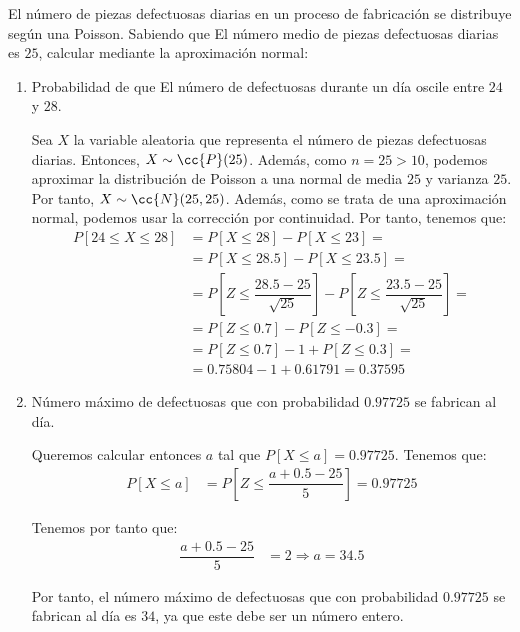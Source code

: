 \begin{ejercicio}
    El número de piezas defectuosas diarias en un proceso de fabricación se distribuye según una Poisson. Sabiendo que El número medio de piezas defectuosas diarias es $25$, calcular mediante la aproximación normal:
    \begin{enumerate}
        \item Probabilidad de que El número de defectuosas durante un día oscile entre $24$ y $28$.
        
        Sea $X$ la variable aleatoria que representa el número de piezas defectuosas diarias. Entonces, $X\sim \cc{P}(25)$. Además, como $n=25>10$, podemos aproximar la distribución de Poisson a una normal de media $25$ y varianza $25$. Por tanto, $X\sim \cc{N}(25,25)$.
        Además, como se trata de una aproximación normal, podemos usar la corrección por continuidad. Por tanto, tenemos que:
        \begin{align*}
            P[24\leq X\leq 28] &= P[X\leq 28] - P[X\leq 23] =\\&= P[X\leq 28.5] - P[X\leq 23.5] =\\&= P\left[Z\leq \dfrac{28.5-25}{\sqrt{25}}\right] - P\left[Z\leq \dfrac{23.5-25}{\sqrt{25}}\right] =\\&= P\left[Z\leq 0.7\right] - P\left[Z\leq -0.3\right] =\\&=
            P\left[Z\leq 0.7\right] - 1 + P\left[Z\leq 0.3\right] =\\&= 0.75804 - 1 + 0.61791 = 0.37595
        \end{align*}


        \item Número máximo de defectuosas que con probabilidad $0.97725$ se fabrican al día.
        
        Queremos calcular entonces $a$ tal que $P[X\leq a] = 0.97725$. Tenemos que:
        \begin{align*}
            P[X\leq a] &= P\left[Z\leq \dfrac{a+0.5-25}{5}\right] = 0.97725
        \end{align*}

        Tenemos por tanto que:
        \begin{align*}
            \dfrac{a+0.5-25}{5} &= 2 \Longrightarrow a = 34.5
        \end{align*}

        Por tanto, el número máximo de defectuosas que con probabilidad $0.97725$ se fabrican al día es $34$, ya que este debe ser un número entero.


\end{enumerate}
\end{ejercicio}
